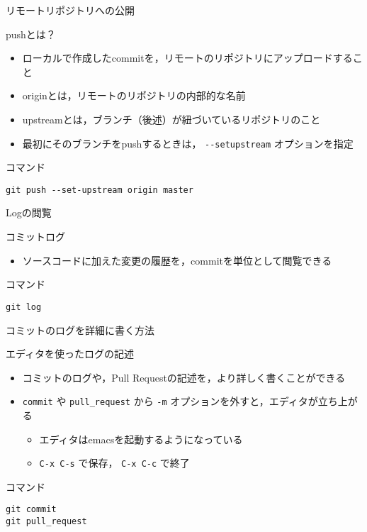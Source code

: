 \documentclass[t, aspectratio=169]{beamer}
\begin{document}
\begin{frame}[fragile,label=sec-2-3-5]{リモートリポジトリへの公開}
 \begin{block}{pushとは？}
\begin{itemize}
\item ローカルで作成したcommitを，リモートのリポジトリにアップロードすること
\item originとは，リモートのリポジトリの内部的な名前
\item upstreamとは，ブランチ（後述）が紐づいているリポジトリのこと
\item 最初にそのブランチをpushするときは， \texttt{-{}-setupstream} オプションを指定
\end{itemize}
\end{block}

\begin{block}{コマンド}
\begin{verbatim}
git push --set-upstream origin master
\end{verbatim}
\end{block}
\end{frame}
\begin{frame}[fragile,label=sec-2-3-6]{Logの閲覧}
 \begin{block}{コミットログ}
\begin{itemize}
\item ソースコードに加えた変更の履歴を，commitを単位として閲覧できる
\end{itemize}
\end{block}

\begin{block}{コマンド}
\begin{verbatim}
git log
\end{verbatim}
\end{block}
\end{frame}
\begin{frame}[fragile,label=sec-2-3-7]{コミットのログを詳細に書く方法}
 \begin{block}{エディタを使ったログの記述}
\begin{itemize}
\item コミットのログや，Pull Requestの記述を，より詳しく書くことができる
\item \texttt{commit} や \texttt{pull\_request} から  \texttt{-m} オプションを外すと，エディタが立ち上がる
\begin{itemize}
\item エディタはemacsを起動するようになっている
\item \texttt{C-x C-s} で保存， \texttt{C-x C-c} で終了
\end{itemize}
\end{itemize}
\end{block}

\begin{block}{コマンド}
\begin{verbatim}
git commit
git pull_request
\end{verbatim}
\end{block}
\end{frame}
\end{document}
